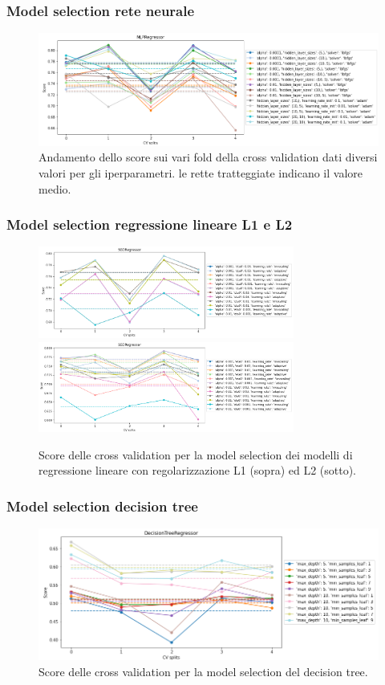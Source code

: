 \documentclass{beamer}
\begin{document}
\begin{frame}
	\frametitle{Model selection rete neurale}
	\begin{figure}[ht]
		\centering
		\includegraphics[width=\textwidth]{nncv.png}
		\caption{Andamento dello score sui vari fold della cross validation dati
		diversi valori per gli iperparametri. le rette tratteggiate indicano il
		valore medio.}
	\end{figure}
\end{frame}

\begin{frame}
	\frametitle{Model selection regressione lineare L1 e L2}
	\begin{figure}[ht]
		\centering
		\includegraphics[width=0.75\textwidth]{lassocv.png}
		\includegraphics[width=0.75\textwidth]{ridgecv.png}
		\caption{Score delle cross validation per la model selection dei modelli
		di regressione lineare con regolarizzazione L1 (sopra) ed L2 (sotto).}
	\end{figure}
\end{frame}

\begin{frame}
	\frametitle{Model selection decision tree}
	\begin{figure}[ht]
		\centering
		\includegraphics[width=\textwidth]{treecv.png}
		\caption{Score delle cross validation per la model selection del decision
		tree.}
	\end{figure}
\end{frame}
\end{document}
